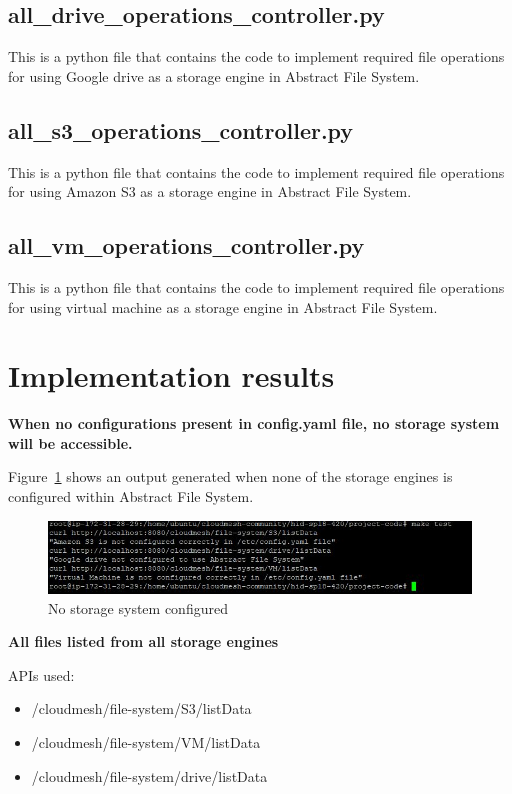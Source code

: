 \subsection{all\_drive\_operations\_controller.py}
This is a python file that contains the code to implement required file 
operations for using Google drive as a storage engine in Abstract File System.

\subsection{all\_s3\_operations\_controller.py}
This is a python file that contains the code to implement required file 
operations for using Amazon S3 as a storage engine in Abstract File System. 

\subsection{all\_vm\_operations\_controller.py}
This is a python file that contains the code to implement required file 
operations for using virtual machine as a storage engine in Abstract File 
System. 


\section{Implementation results}

\textbf{When no configurations present in config.yaml file, no storage 
system will be accessible.}


Figure~\ref{fig:not-configured} shows an output generated when none of 
the storage engines is configured within Abstract File System. 


\begin{figure}[!ht]
        \centering\includegraphics[width=\columnwidth]
        {image/not-configured.JPG}
        \caption{No storage system configured}\label{fig:not-configured}
\end{figure}



\textbf{All files listed from all storage engines }


APIs used:

\begin{itemize}
    \item /cloudmesh/file-system/S3/listData
    \item /cloudmesh/file-system/VM/listData
    \item /cloudmesh/file-system/drive/listData
\end{itemize}

